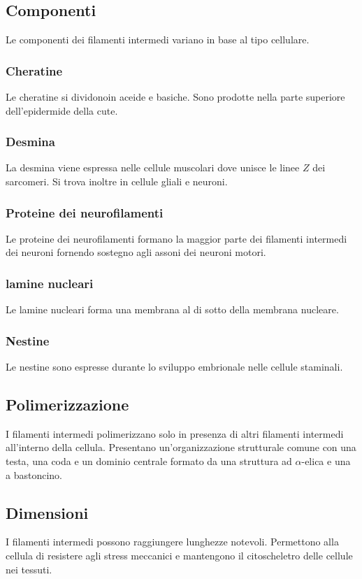 	\subsection{Componenti}
	Le componenti dei filamenti intermedi variano in base al tipo cellulare.

		\subsubsection{Cheratine}
		Le cheratine si dividonoin aceide e basiche.
		Sono prodotte nella parte superiore dell'epidermide della cute.

		\subsubsection{Desmina}
		La desmina viene espressa nelle cellule muscolari dove unisce le linee $Z$ dei sarcomeri.
		Si trova inoltre in cellule gliali e neuroni.

		\subsubsection{Proteine dei neurofilamenti}
		Le proteine dei neurofilamenti formano la maggior parte dei filamenti intermedi dei neuroni fornendo sostegno agli assoni dei neuroni motori.

		\subsubsection{lamine nucleari}
		Le lamine nucleari forma una membrana al di sotto della membrana nucleare.

		\subsubsection{Nestine}
		Le nestine sono espresse durante lo sviluppo embrionale nelle cellule staminali.

	\subsection{Polimerizzazione}
	I filamenti intermedi polimerizzano solo in presenza di altri filamenti intermedi all'interno della cellula.
	Presentano un'organizzazione strutturale comune con una testa, una coda e un dominio centrale formato da una struttura ad $\alpha$-elica e una a bastoncino.

	\subsection{Dimensioni}
	I filamenti intermedi possono raggiungere lunghezze notevoli.
	Permettono alla cellula di resistere agli stress meccanici e mantengono il citoscheletro delle cellule nei tessuti.

